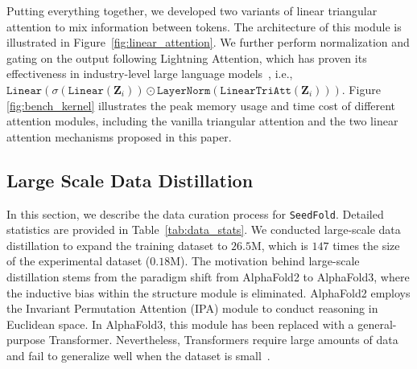\documentclass[]{bytedance_seed}
\begin{document}
Putting everything together, we developed two variants of linear triangular attention to mix information between tokens. The architecture of this module is illustrated in Figure~\ref{fig:linear_attention}. We further perform normalization and gating on the output following Lightning Attention, which has proven its effectiveness in industry-level large language models~\cite{qin2024lightning, qin2024transnormerllm, minimax2025minimax01scalingfoundationmodels}, i.e., $\mathtt{Linear}(\sigma(\mathtt{Linear}(\mathbf{Z}_i))\odot\mathtt{LayerNorm}(\mathtt{LinearTriAtt}(\mathbf{Z}_i)))$. Figure \ref{fig:bench_kernel} illustrates the peak memory usage and time cost of different attention modules, including the vanilla triangular attention and the two linear attention mechanisms proposed in this paper.









\subsection{Large Scale Data Distillation}
\label{sec:data_scaling}

In this section, we describe the data curation process for \texttt{SeedFold}. Detailed statistics are provided in Table~\ref{tab:data_stats}. We conducted large-scale data distillation to expand the training dataset to $26.5$M, which is $147$ times the size of the experimental dataset ($0.18$M). The motivation behind large-scale distillation stems from the paradigm shift from AlphaFold2 to AlphaFold3, where the inductive bias within the structure module is eliminated. AlphaFold2 employs the Invariant Permutation Attention (IPA) module to conduct reasoning in Euclidean space. In AlphaFold3, this module has been replaced with a general-purpose Transformer. Nevertheless, Transformers require large amounts of data and fail to generalize well when the dataset is small~\cite{dosovitskiy2020image}.
\end{document}
